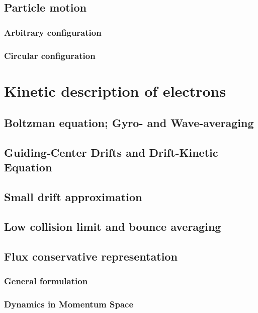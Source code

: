 \documentclass[11pt,a4paper]{report}
\begin{document}
	\section{Particle motion}
		\subsection{Arbitrary configuration}
		

		\subsection{Circular configuration}
		\label{circonc}
		

\chapter{Kinetic description of electrons}

	\section{Boltzman equation; Gyro- and Wave-averaging}
	

	\section{Guiding-Center Drifts and Drift-Kinetic Equation}
	

	\section{Small drift approximation}
	

	\section{Low collision limit and bounce averaging}
	

	\section{Flux conservative representation}

		\subsection{General formulation}
		

		\subsection{Dynamics in Momentum Space}
		
\end{document}
